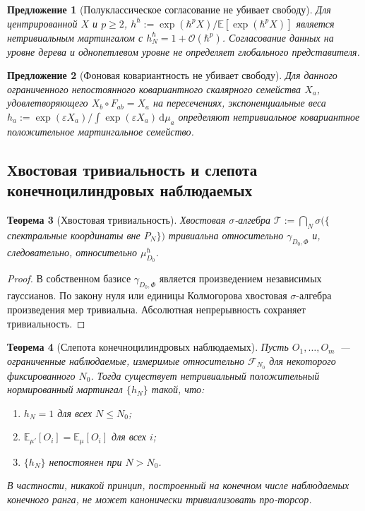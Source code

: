 \documentclass[12pt,a4paper]{article}
\theoremstyle{plain}
\newtheorem{theorem}{Теорема}[section]
\newtheorem{proposition}[theorem]{Предложение}
\theoremstyle{definition}
\theoremstyle{remark}
\newcommand{\dd}{\mathrm{d}}
\newcommand{\cF}{\mathcal{F}}
\newcommand{\E}{\mathbb{E}}
\newcommand{\order}{\mathcal{O}}
\begin{document}
\begin{proposition}[Полуклассическое согласование не убивает свободу]
\label{prop:semiclassical-nogo}
Для центрированной $X$ и $p \ge 2$,
$h^\hbar := \exp(\hbar^p X)/\E[\exp(\hbar^p X)]$ является
нетривиальным мартингалом с $h_N^\hbar = 1 + \order(\hbar^p)$.
Согласование данных на уровне дерева и однопетлевом уровне не
определяет глобального представителя.
\end{proposition}

\begin{proposition}[Фоновая ковариантность не убивает свободу]
\label{prop:bg-nogo}
Для данного ограниченного непостоянного ковариантного скалярного
семейства $X_a$, удовлетворяющего
$X_b \circ F_{ab} = X_a$ на пересечениях, экспоненциальные
веса $h_a := \exp(\varepsilon X_a)/\int\exp(\varepsilon X_a)\,\dd\mu_a$
определяют нетривиальное ковариантное положительное мартингальное
семейство.
\end{proposition}

\subsection{Хвостовая тривиальность и слепота конечноцилиндровых
наблюдаемых}

\begin{theorem}[Хвостовая тривиальность]
\label{thm:tail}
Хвостовая $\sigma$-алгебра
$\mathcal{T} := \bigcap_N \sigma(\{$спектральные координаты вне
$P_N\})$ тривиальна относительно $\gamma_{D_0,\Phi}$ и, следовательно,
относительно $\mu_{D_0}^\hbar$.
\end{theorem}

\begin{proof}
В собственном базисе $\gamma_{D_0,\Phi}$ является произведением
независимых гауссианов.  По закону нуля или единицы Колмогорова
хвостовая $\sigma$-алгебра произведения мер тривиальна.
Абсолютная непрерывность сохраняет тривиальность.
\end{proof}

\begin{theorem}[Слепота конечноцилиндровых наблюдаемых]
\label{thm:blindness}
Пусть $O_1, \ldots, O_m$~--- ограниченные наблюдаемые,
измеримые относительно $\cF_{N_0}$ для некоторого фиксированного
$N_0$.  Тогда существует нетривиальный положительный
нормированный мартингал $\{h_N\}$ такой, что:
\begin{enumerate}[label=\textup{(\roman*)},leftmargin=2.5em]
  \item $h_N = 1$ для всех $N \le N_0$;
  \item $\E_{\mu'}[O_i] = \E_\mu[O_i]$ для всех $i$;
  \item $\{h_N\}$ непостоянен при $N > N_0$.
\end{enumerate}
В частности, никакой принцип, построенный на конечном числе
наблюдаемых конечного ранга, не может канонически тривиализовать
про-торсор.
\end{theorem}
\end{document}
